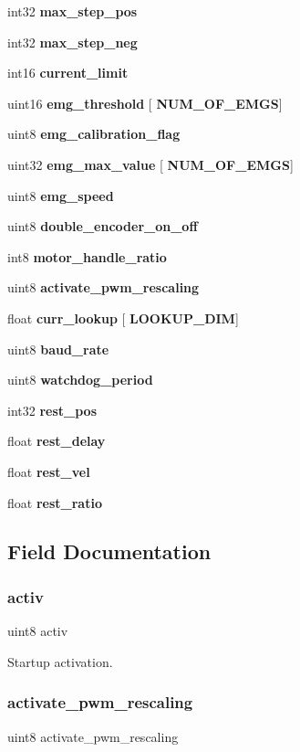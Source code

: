 \begin{DoxyCompactItemize}
int32 \textbf{ max\+\_\+step\+\_\+pos}
\item 
int32 \textbf{ max\+\_\+step\+\_\+neg}
\item 
int16 \textbf{ current\+\_\+limit}
\item 
uint16 \textbf{ emg\+\_\+threshold} [\textbf{ N\+U\+M\+\_\+\+O\+F\+\_\+\+E\+M\+GS}]
\item 
uint8 \textbf{ emg\+\_\+calibration\+\_\+flag}
\item 
uint32 \textbf{ emg\+\_\+max\+\_\+value} [\textbf{ N\+U\+M\+\_\+\+O\+F\+\_\+\+E\+M\+GS}]
\item 
uint8 \textbf{ emg\+\_\+speed}
\item 
uint8 \textbf{ double\+\_\+encoder\+\_\+on\+\_\+off}
\item 
int8 \textbf{ motor\+\_\+handle\+\_\+ratio}
\item 
uint8 \textbf{ activate\+\_\+pwm\+\_\+rescaling}
\item 
float \textbf{ curr\+\_\+lookup} [\textbf{ L\+O\+O\+K\+U\+P\+\_\+\+D\+IM}]
\item 
uint8 \textbf{ baud\+\_\+rate}
\item 
uint8 \textbf{ watchdog\+\_\+period}
\item 
int32 \textbf{ rest\+\_\+pos}
\item 
float \textbf{ rest\+\_\+delay}
\item 
float \textbf{ rest\+\_\+vel}
\item 
float \textbf{ rest\+\_\+ratio}
\end{DoxyCompactItemize}


\subsection{Field Documentation}
\mbox{\label{structst__mem_a63bbebc1db55f43e0571006597a3488b}} 
\subsubsection{activ}
{\footnotesize\ttfamily uint8 activ}

Startup activation. \mbox{\label{structst__mem_a53d9d645351f4020826ab8c56c91b244}} 
\subsubsection{activate\+\_\+pwm\+\_\+rescaling}
{\footnotesize\ttfamily uint8 activate\+\_\+pwm\+\_\+rescaling}

